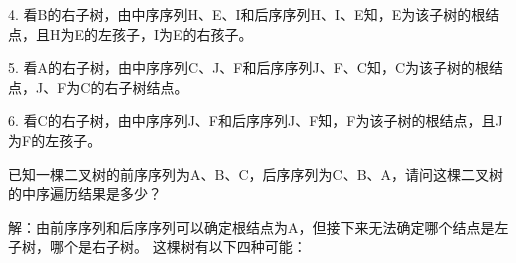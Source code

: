 \begin{frame}\ft{\secname}  
4. 看B的右子树，由中序序列H、E、I和后序序列H、I、E知，E为该子树的根结点，且H为E的左孩子，I为E的右孩子。
\begin{figure}
\centering

\end{figure}
\end{frame}

\begin{frame}\ft{\secname}  
5. 看A的右子树，由中序序列C、J、F和后序序列J、F、C知，C为该子树的根结点，J、F为C的右子树结点。
\begin{figure}
\centering

\end{figure}
\end{frame}

\begin{frame}\ft{\secname}  
6. 看C的右子树，由中序序列J、F和后序序列J、F知，F为该子树的根结点，且J为F的左孩子。
\begin{figure}
\centering

\end{figure}
\end{frame}
%
\begin{frame}\ft{\secname}  
\begin{wenti}
已知一棵二叉树的前序序列为A、B、C，后序序列为C、B、A，请问这棵二叉树的中序遍历结果是多少？
\end{wenti}
\pause

\textcolor{acolor3}{解：}由前序序列和后序序列可以确定根结点为A，但接下来无法确定哪个结点是左子树，哪个是右子树。%
这棵树有以下四种可能：
\begin{figure}
\centering

\end{figure}

\end{frame}


